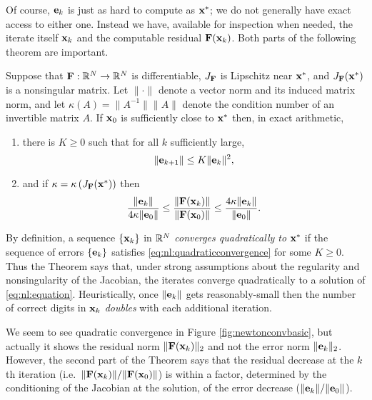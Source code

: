 Of course, $\mathbf{e}_k$ is just as hard to compute as $\mathbf{x}^*$; we do not generally have exact access to either one.  Instead we have, available for inspection when needed, the iterate itself $\mathbf{x}_k$ and the computable residual $\mathbf{F}(\mathbf{x}_k)$.  Both parts of the following theorem are important.

\begin{theorem} \citep[Theorems 1.1 and inequalities (1.13)]{Kelley2003}
Suppose that $\mathbf{F}:\mathbb{R}^N\to\mathbb{R}^N$ is differentiable, $J_{\mathbf{F}}$ is Lipschitz near $\mathbf{x}^*$, and $J_{\mathbf{F}}(\mathbf{x}^*)$ is a nonsingular matrix.  Let $\|\cdot\|$ denote a vector norm and its induced matrix norm, and let $\kappa(A)=\|A^{-1}\| \|A\|$ denote the condition number of an invertible matrix $A$.  If $\mathbf{x}_0$ is sufficiently close to $\mathbf{x}^*$ then, in exact arithmetic,
\renewcommand{\labelenumi}{(\roman{enumi})}
\begin{enumerate}
\item there is $K\ge 0$ such that for all $k$ sufficiently large,
\begin{equation}
	\|\mathbf{e}_{k+1}\| \le K \|\mathbf{e}_k\|^2, \label{eq:nl:quadraticconvergence}
\end{equation}
\item and if $\kappa = \kappa\left(J_{\mathbf{F}}(\mathbf{x}^*)\right)$ then
\begin{equation}
	\frac{\|\mathbf{e}_k\|}{4 \kappa \|\mathbf{e}_0\|} \le \frac{\|\mathbf{F}(\mathbf{x}_k)\|}{\|\mathbf{F}(\mathbf{x}_0)\|} \le \frac{4 \kappa \|\mathbf{e}_k\|}{\|\mathbf{e}_0\|}. \label{eq:nl:errorresidualnormequiv}
\end{equation}
\end{enumerate}
\end{theorem}

\medskip
By definition, a sequence $\{\mathbf{x}_k\}$ in $\mathbb{R}^N$ \emph{converges quadratically to} $\mathbf{x}^*$ if the sequence of errors $\{\mathbf{e}_k\}$ satisfies \eqref{eq:nl:quadraticconvergence} for some $K\ge 0$.  Thus the Theorem says that, under strong assumptions about the regularity and nonsingularity of the Jacobian, the iterates converge quadratically to a solution of \eqref{eq:nl:equation}.  Heuristically, once $\|\mathbf{e}_k\|$ gets reasonably-small then the number of correct digits in $\mathbf{x}_k$ \emph{doubles} with each additional iteration.

We seem to see quadratic convergence in Figure \ref{fig:newtonconvbasic}, but actually it shows the residual norm $\|\mathbf{F}(\mathbf{x}_k)\|_2$ and not the error norm $\|\mathbf{e}_k\|_2$.  However, the second part of the Theorem says that the residual decrease at the $k$th iteration (i.e.~$\|\mathbf{F}(\mathbf{x}_k)\|/\|\mathbf{F}(\mathbf{x}_0)\|$) is within a factor, determined by the conditioning of the Jacobian at the solution, of the error decrease ($\|\mathbf{e}_k\|/\|\mathbf{e}_0\|$).

